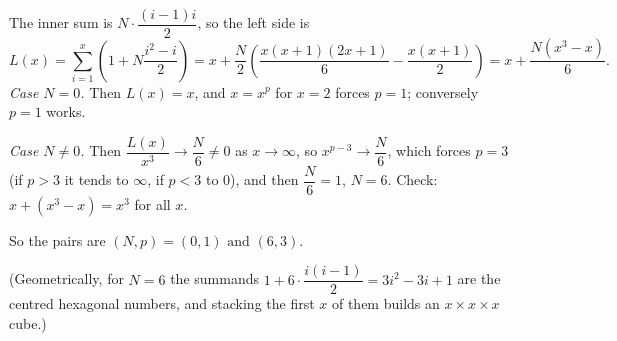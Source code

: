 The inner sum is \(N\cdot\dfrac{(i-1)i}{2}\), so the left side is
\[
L(x)=\sum_{i=1}^{x}\left(1+N\dfrac{i^2-i}{2}\right)=x+\dfrac {N}{2}\left(\dfrac{x(x+1)(2x+1)}{6}-\dfrac{x(x+1)}{2}\right)=x+\dfrac{N(x^3-x)}{6}.
\]
\emph{Case \(N=0\).} Then \(L(x)=x\), and \(x=x^p\) for \(x=2\) forces \(p=1\); conversely \(p=1\) works.

\emph{Case \(N\ne0\).} Then \(\dfrac{L(x)}{x^3}\to\dfrac {N}{6}\ne0\) as \(x\to\infty\), so \(x^{p-3}\to\dfrac {N}{6}\), which forces \(p=3\) (if \(p>3\) it tends to \(\infty\), if \(p<3\) to \(0\)), and then \(\dfrac {N}{6}=1\), \(N=6\). Check: \(x+(x^3-x)=x^3\) for all \(x\).

So the pairs are \(\boxed{(N,p)=(0,1)\text{ and }(6,3)}\).

(Geometrically, for \(N=6\) the summands \(1+6\cdot\dfrac{i(i-1)}{2}=3i^2-3i+1\) are the centred hexagonal numbers, and stacking the first \(x\) of them builds an \(x\times x\times x\) cube.)
